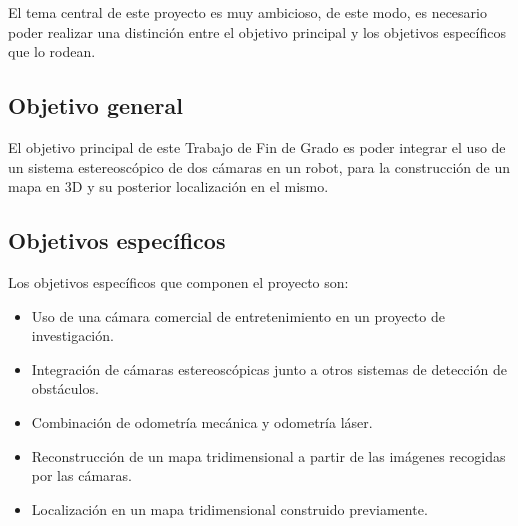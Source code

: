 

El tema central de este proyecto es muy ambicioso, de este modo, es necesario
poder realizar una distinción entre el objetivo principal y los objetivos
específicos que lo rodean.

\subsection{Objetivo general}
El objetivo principal de este Trabajo de Fin de Grado es poder integrar el uso
de un sistema estereoscópico de dos cámaras en un robot, para la construcción de
un mapa en 3D y su posterior localización en el mismo.

\subsection{Objetivos específicos}
Los objetivos específicos que componen el proyecto son:
\begin{itemize}
  \item Uso de una cámara comercial de entretenimiento en un proyecto de
  investigación.
  \item Integración de cámaras estereoscópicas junto a otros sistemas de
  detección de obstáculos.
  \item Combinación de odometría mecánica y odometría láser.
  \item Reconstrucción de un mapa tridimensional a partir de las imágenes
  recogidas por las cámaras.
  \item Localización en un mapa tridimensional construido previamente.
\end{itemize}

